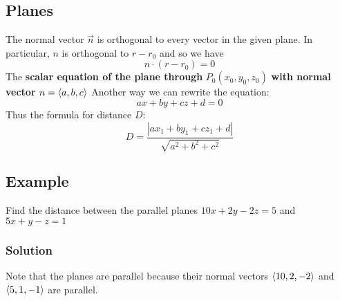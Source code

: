 \subsection*{Planes}
The normal vector $\vec{n}$ is orthogonal to every vector in the given plane. In particular, $n$ is orthogonal to $r - r_0$ and so we have
$$n\cdot(r - r_0) = 0$$ The \textbf{scalar equation of the plane through} $P_0(x_0, y_0, z_0)$ \textbf{with normal vector} $n = \ev{a,b,c}$
Another way we can rewrite the equation: $$ax + by + cz + d = 0$$
Thus the formula for distance $D$:
$$D = \frac{|ax_1 + by_1 + cz_1 + d|}{\sqrt{a^2 + b^2 + c^2}}$$

\subsection*{Example}
Find the distance between the parallel planes $10x + 2y - 2z = 5$ and $5x + y - z = 1$
\subsubsection*{Solution} Note that the planes are parallel because their normal vectors $\ev{10, 2, -2}$ and $\ev{5, 1, -1}$ are parallel.





